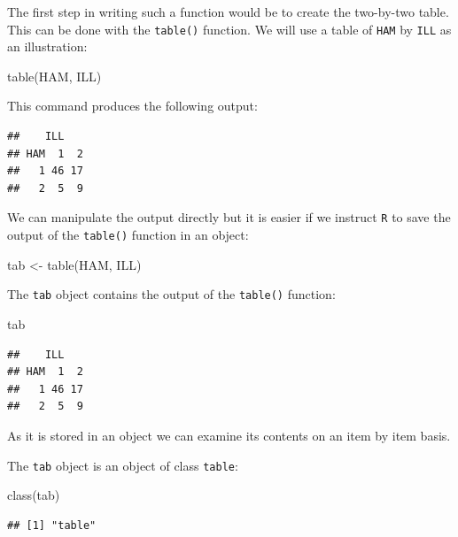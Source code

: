 \documentclass[
  12pt,
]{book}
\newenvironment{Shaded}{\begin{snugshade}}{\end{snugshade}}
\newcommand{\FunctionTok}[1]{\textcolor[rgb]{0.00,0.00,0.00}{#1}}
\newcommand{\NormalTok}[1]{#1}
\newcommand{\OtherTok}[1]{\textcolor[rgb]{0.56,0.35,0.01}{#1}}
\begin{document}
The first step in writing such a function would be to create the two-by-two table. This can be done with the \texttt{table()} function. We will use a table of \texttt{HAM} by \texttt{ILL} as an illustration:

\begin{Shaded}
\begin{Highlighting}[]
\FunctionTok{table}\NormalTok{(HAM, ILL)}
\end{Highlighting}
\end{Shaded}

This command produces the following output:

\begin{verbatim}
##    ILL
## HAM  1  2
##   1 46 17
##   2  5  9
\end{verbatim}

We can manipulate the output directly but it is easier if we instruct \texttt{R} to save the output of the \texttt{table()} function in an object:

\begin{Shaded}
\begin{Highlighting}[]
\NormalTok{tab }\OtherTok{\textless{}{-}} \FunctionTok{table}\NormalTok{(HAM, ILL)}
\end{Highlighting}
\end{Shaded}

\newpage

The \texttt{tab} object contains the output of the \texttt{table()} function:

\begin{Shaded}
\begin{Highlighting}[]
\NormalTok{tab}
\end{Highlighting}
\end{Shaded}

\begin{verbatim}
##    ILL
## HAM  1  2
##   1 46 17
##   2  5  9
\end{verbatim}

As it is stored in an object we can examine its contents on an item by item basis.

The \texttt{tab} object is an object of class \texttt{table}:

\begin{Shaded}
\begin{Highlighting}[]
\FunctionTok{class}\NormalTok{(tab)}
\end{Highlighting}
\end{Shaded}

\begin{verbatim}
## [1] "table"
\end{verbatim}
\end{document}
